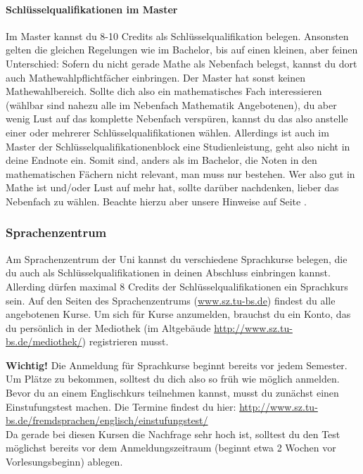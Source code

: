 \begin{multicols}{2}
	\paragraph*{Schlüsselqualifikationen im Master}
	Im Master kannst du 8-10 Credits als Schlüsselqualifikation belegen. Ansonsten gelten die gleichen Regelungen wie im Bachelor, bis auf einen kleinen, aber feinen Unterschied: Sofern du nicht gerade Mathe als Nebenfach belegst, kannst du dort auch Mathewahlpflichtfächer einbringen. Der Master hat sonst keinen Mathewahlbereich. Sollte dich also ein mathematisches Fach interessieren (wählbar sind nahezu alle im Nebenfach Mathematik Angebotenen), du aber wenig Lust auf das komplette Nebenfach verspüren, kannst du das also anstelle einer oder mehrerer Schlüsselqualifikationen wählen. Allerdings ist auch im Master der Schlüsselqualifikationenblock eine Studienleistung, geht also nicht in deine Endnote ein. Somit sind, anders als im Bachelor, die Noten in den mathematischen Fächern nicht relevant, man muss nur bestehen. Wer also gut in Mathe ist und/oder Lust auf mehr hat, sollte darüber nachdenken, lieber das Nebenfach zu wählen. Beachte hierzu aber unsere Hinweise auf Seite \pageref{nebenfach}.

	\subsubsection*{Sprachenzentrum}
	Am Sprachenzentrum der Uni kannst du verschiedene Sprachkurse belegen, die du auch als Schlüsselqualifikationen in deinen Abschluss einbringen kannst. Allerding dürfen maximal 8 Credits der Schlüsselqualifikationen ein Sprachkurs sein. Auf den Seiten des Sprachenzentrums (\url{www.sz.tu-bs.de}) findest du alle angebotenen Kurse. Um sich für Kurse anzumelden, brauchst du ein Konto, das du persönlich in der Mediothek (im Altgebäude \url{http://www.sz.tu-bs.de/mediothek/}) registrieren musst.

	\textbf{Wichtig!} Die Anmeldung für Sprachkurse beginnt bereits vor jedem Semester. Um Plätze zu bekommen, solltest du dich also so früh wie möglich anmelden. Bevor du an einem Englischkurs teilnehmen kannst, musst du zunächst einen Einstufungstest machen. Die Termine findest du hier: \url{http://www.sz.tu-bs.de/fremdsprachen/englisch/einstufungstest/}\\ 
	Da gerade bei diesen Kursen die Nachfrage sehr hoch ist, solltest du den Test möglichst bereits vor dem Anmeldungszeitraum (beginnt etwa 2 Wochen vor Vorlesungsbeginn) ablegen.


\end{multicols}
